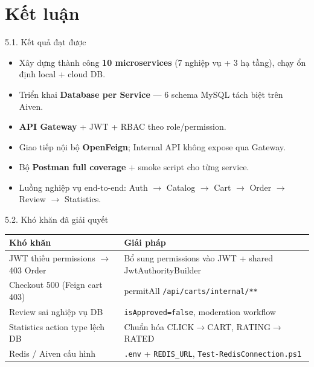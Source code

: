\documentclass[aspectratio=169,12pt]{beamer}
\begin{document}
\section{Kết luận}

\begin{frame}{5.1. Kết quả đạt được}
  \begin{itemize}
    \item Xây dựng thành công \textbf{10 microservices} (7 nghiệp vụ + 3 hạ tầng), chạy ổn định local + cloud DB.
    \item Triển khai \textbf{Database per Service} — 6 schema MySQL tách biệt trên Aiven.
    \item \textbf{API Gateway} + JWT + RBAC theo role/permission.
    \item Giao tiếp nội bộ \textbf{OpenFeign}; Internal API không expose qua Gateway.
    \item Bộ \textbf{Postman full coverage} + smoke script cho từng service.
    \item Luồng nghiệp vụ end-to-end: Auth $\rightarrow$ Catalog $\rightarrow$ Cart $\rightarrow$ Order $\rightarrow$ Review $\rightarrow$ Statistics.
  \end{itemize}
\end{frame}

\begin{frame}{5.2. Khó khăn đã giải quyết}
  \begin{table}
    \centering\small
    \begin{tabular}{@{}p{4.2cm}p{7.8cm}@{}}
      \toprule
      \textbf{Khó khăn} & \textbf{Giải pháp} \\
      \midrule
      JWT thiếu permissions $\rightarrow$ 403 Order & Bổ sung permissions vào JWT + shared JwtAuthorityBuilder \\
      Checkout 500 (Feign cart 403) & permitAll \texttt{/api/carts/internal/**} \\
      Review sai nghiệp vụ DB & \texttt{isApproved=false}, moderation workflow \\
      Statistics action type lệch DB & Chuẩn hóa CLICK$\rightarrow$CART, RATING$\rightarrow$RATED \\
      Redis / Aiven cấu hình & \texttt{.env} + \texttt{REDIS\_URL}, \texttt{Test-RedisConnection.ps1} \\
      \bottomrule
    \end{tabular}
  \end{table}
\end{frame}
\end{document}
